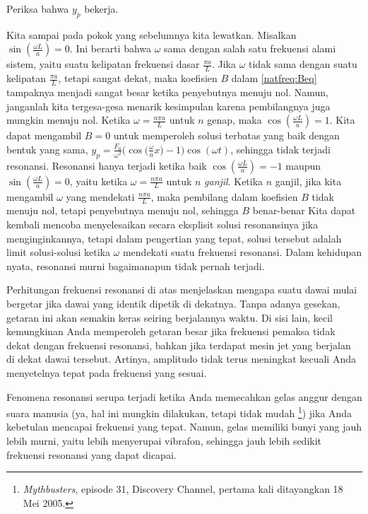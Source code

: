 \begin{exercise}
Periksa bahwa $y_p$ bekerja.
\end{exercise}

Kita sampai pada pokok yang sebelumnya kita lewatkan.  Misalkan 
$\sin ( \frac{\omega L}{a} ) = 0$.  Ini berarti bahwa
$\omega$ sama dengan salah satu frekuensi alami sistem,
yaitu suatu kelipatan frekuensi dasar $\frac{\pi a}{L}$.
Jika $\omega$
tidak sama dengan suatu kelipatan $\frac{\pi a}{L}$,
tetapi sangat dekat,
maka koefisien $B$ dalam \eqref{natfreq:Beq} tampaknya
menjadi sangat besar ketika penyebutnya menuju nol.
Namun, janganlah kita tergesa-gesa menarik kesimpulan
karena pembilangnya juga mungkin menuju nol.
Ketika $\omega = \frac{n \pi a}{L}$
untuk $n$ genap, maka $\cos (\frac{\omega L}{a}) = 1$.
Kita dapat mengambil
$B=0$ untuk memperoleh solusi terbatas yang baik dengan bentuk yang sama,
$y_p = 
\frac{F_0}{\omega^2}
\bigl(
 \cos\bigl(\frac{\omega}{a} x\bigr) -  1 \bigr)
\cos(\omega t)$, sehingga tidak terjadi resonansi.
Resonansi hanya terjadi ketika 
baik $\cos (\frac{\omega L}{a}) = -1$ maupun
$\sin (\frac{\omega L}{a}) = 0$,
yaitu ketika $\omega = \frac{n \pi a }{L}$
untuk $n$ \emph{ganjil}.
Ketika $n$ ganjil, jika kita mengambil $\omega$ yang mendekati
$\frac{n \pi a }{L}$, maka pembilang dalam koefisien
$B$ tidak menuju nol, tetapi penyebutnya menuju nol, sehingga $B$ benar-benar
Kita dapat kembali mencoba menyelesaikan secara eksplisit solusi resonansinya jika menginginkannya, tetapi dalam pengertian yang tepat, solusi tersebut adalah limit solusi-solusi ketika $\omega$
mendekati suatu frekuensi resonansi.
Dalam kehidupan nyata, resonansi murni bagaimanapun tidak pernah terjadi.

Perhitungan frekuensi resonansi di atas menjelaskan mengapa suatu dawai mulai
bergetar jika
dawai yang identik dipetik di dekatnya.  Tanpa adanya gesekan, getaran ini
akan semakin keras seiring berjalannya waktu.
Di sisi lain, kecil kemungkinan Anda memperoleh getaran besar jika frekuensi pemaksa 
tidak dekat dengan frekuensi resonansi, bahkan jika terdapat mesin jet yang
berjalan di dekat
dawai tersebut.  Artinya, amplitudo tidak terus
meningkat kecuali Anda menyetelnya tepat pada frekuensi yang sesuai.

Fenomena resonansi serupa terjadi ketika Anda memecahkan gelas anggur dengan suara manusia
(ya,
hal ini mungkin dilakukan, tetapi tidak mudah%
\footnote{\emph{Mythbusters}, episode 31, Discovery Channel, pertama kali ditayangkan
18 Mei 2005.}) jika Anda kebetulan mencapai frekuensi yang tepat.
Namun, gelas memiliki bunyi yang jauh lebih murni, yaitu lebih menyerupai
vibrafon, sehingga jauh lebih sedikit frekuensi resonansi yang dapat dicapai.

